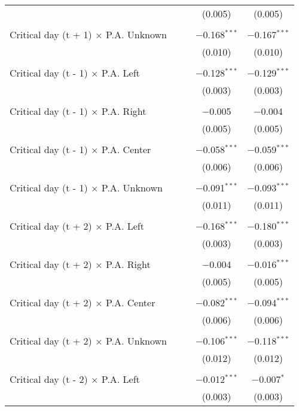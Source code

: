 \documentclass[
]{article}
\begin{document}
\begin{table}[!htbp]
{\begin{tabular}{@{\extracolsep{5pt}}lcccc}
  &  &  & (0.005) & (0.005) \\ 
  & & & & \\ 
 Critical day (t + 1) $\times$ P.A. Unknown &  &  & $-$0.168$^{***}$ & $-$0.167$^{***}$ \\ 
  &  &  & (0.010) & (0.010) \\ 
  & & & & \\ 
 Critical day (t - 1) $\times$ P.A. Left &  &  & $-$0.128$^{***}$ & $-$0.129$^{***}$ \\ 
  &  &  & (0.003) & (0.003) \\ 
  & & & & \\ 
 Critical day (t - 1) $\times$ P.A. Right &  &  & $-$0.005 & $-$0.004 \\ 
  &  &  & (0.005) & (0.005) \\ 
  & & & & \\ 
 Critical day (t - 1) $\times$ P.A. Center &  &  & $-$0.058$^{***}$ & $-$0.059$^{***}$ \\ 
  &  &  & (0.006) & (0.006) \\ 
  & & & & \\ 
 Critical day (t - 1) $\times$ P.A. Unknown &  &  & $-$0.091$^{***}$ & $-$0.093$^{***}$ \\ 
  &  &  & (0.011) & (0.011) \\ 
  & & & & \\ 
 Critical day (t + 2) $\times$ P.A. Left &  &  & $-$0.168$^{***}$ & $-$0.180$^{***}$ \\ 
  &  &  & (0.003) & (0.003) \\ 
  & & & & \\ 
 Critical day (t + 2) $\times$ P.A. Right &  &  & $-$0.004 & $-$0.016$^{***}$ \\ 
  &  &  & (0.005) & (0.005) \\ 
  & & & & \\ 
 Critical day (t + 2) $\times$ P.A. Center &  &  & $-$0.082$^{***}$ & $-$0.094$^{***}$ \\ 
  &  &  & (0.006) & (0.006) \\ 
  & & & & \\ 
 Critical day (t + 2) $\times$ P.A. Unknown &  &  & $-$0.106$^{***}$ & $-$0.118$^{***}$ \\ 
  &  &  & (0.012) & (0.012) \\ 
  & & & & \\ 
 Critical day (t - 2) $\times$ P.A. Left &  &  & $-$0.012$^{***}$ & $-$0.007$^{*}$ \\ 
  &  &  & (0.003) & (0.003) \\ 

\end{tabular}}
\end{table}
\end{document}
